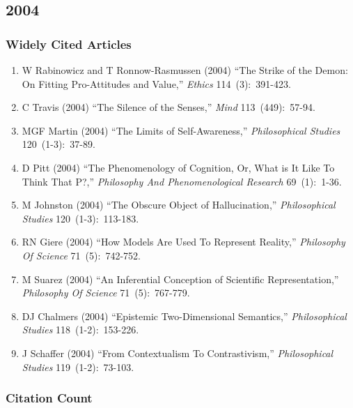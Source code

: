 \documentclass[
  10pt,
  letterpaper,
  DIV=11,
  numbers=noendperiod,
  twoside]{scrartcl}
\providecommand{\tightlist}{%
  \setlength{\itemsep}{0pt}\setlength{\parskip}{0pt}}\usepackage{longtable,booktabs,array}
\begin{document}
\newpage

\subsection{2004}\label{sec-s2004}

\subsubsection*{Widely Cited Articles}\label{widely-cited-articles-48}

\begin{enumerate}
\def\labelenumi{\arabic{enumi}.}
\tightlist
\item
  W Rabinowicz and T Ronnow-Rasmussen (2004) ``The Strike of the Demon:
  On Fitting Pro-Attitudes and Value,'' \emph{Ethics} 114~(3):~391-423.
\item
  C Travis (2004) ``The Silence of the Senses,'' \emph{Mind}
  113~(449):~57-94.
\item
  MGF Martin (2004) ``The Limits of Self-Awareness,''
  \emph{Philosophical Studies} 120~(1-3):~37-89.
\item
  D Pitt (2004) ``The Phenomenology of Cognition, Or, What is It Like To
  Think That P?,'' \emph{Philosophy And Phenomenological Research}
  69~(1):~1-36.
\item
  M Johnston (2004) ``The Obscure Object of Hallucination,''
  \emph{Philosophical Studies} 120~(1-3):~113-183.
\item
  RN Giere (2004) ``How Models Are Used To Represent Reality,''
  \emph{Philosophy Of Science} 71~(5):~742-752.
\item
  M Suarez (2004) ``An Inferential Conception of Scientific
  Representation,'' \emph{Philosophy Of Science} 71~(5):~767-779.
\item
  DJ Chalmers (2004) ``Epistemic Two-Dimensional Semantics,''
  \emph{Philosophical Studies} 118~(1-2):~153-226.
\item
  J Schaffer (2004) ``From Contextualism To Contrastivism,''
  \emph{Philosophical Studies} 119~(1-2):~73-103.
\end{enumerate}

\subsubsection*{Citation Count}\label{sec-count-2004}
\end{document}
